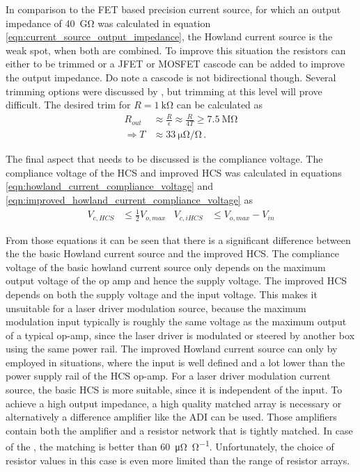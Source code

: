 In comparison to the FET based precision current source, for which an output impedance of \qty{40}{\giga\ohm} was calculated in equation \ref{eqn:current_source_output_impedance}, the Howland current source is the weak spot, when both are combined. To improve this situation the resistors can either to be trimmed or a JFET or MOSFET cascode can be added to improve the output impedance. Do note a cascode is not bidirectional though. Several trimming options were discussed by \citeauthor{howland_pease} \cite{howland_pease}, but trimming at this level will prove difficult. The desired trim for $R=\qty{1}{\kilo\ohm}$ can be calculated as
\begin{align*}
    R_{out} &\approx \frac{R}{\epsilon} \approx \frac{R}{4T} \geq \qty{7.5}{\mega\ohm}\\
    \Rightarrow T &\approx \qty{33}{\micro\ohm \per\ohm}\,.
\end{align*}

The final aspect that needs to be discussed is the compliance voltage. The compliance voltage of the HCS and improved HCS was calculated in equations \ref{eqn:howland_current_compliance_voltage} and \ref{eqn:improved_howland_current_compliance_voltage} as
\begin{align*}
    V_{c, HCS} &\leq \frac{1}{2} V_{o,max} & V_{c, iHCS} &\leq V_{o,max} - V_{in}
\end{align*}

From those equations it can be seen that there is a significant difference between the the basic Howland current source and the improved HCS. The compliance voltage of the basic howland current source only depends on the maximum output voltage of the op amp and hence the supply voltage. The improved HCS depends on both the supply voltage and the input voltage. This makes it unsuitable for a laser driver modulation source, because the maximum modulation input typically is roughly the same voltage as the maximum output of a typical op-amp, since the laser driver is modulated or steered by another box using the same power rail. The improved Howland current source can only by employed in situations, where the input is well defined and a lot lower than the power supply rail of the HCS op-amp. For a laser driver modulation current source, the basic HCS is more suitable, since it is independent of the input. To achieve a high output impedance, a high quality matched array is necessary or alternatively a difference amplifier like the ADI  \cite{datasheet_LT1997} can be used. Those amplifiers contain both the amplifier and a resistor network that is tightly matched. In case of the , the matching is better than \qty{60}{\micro\ohm \per \ohm}. Unfortunately, the choice of resistor values in this case is even more limited than the range of resistor arrays.

